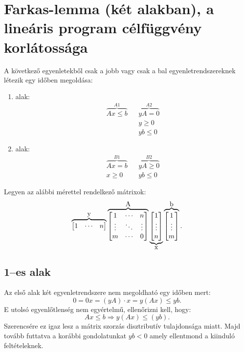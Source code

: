\newpage
\section{Farkas-lemma (két alakban), a lineáris program célfüggvény korlátossága}

A következő egyenletekből csak a jobb vagy csak a bal egyenletrendszereknek
létezik egy időben megoldása:

\begin{enumerate}
  \item alak: \begin{align*}
  \overbrace{Ax \leq b}^{A1}  && \overbrace{yA= 0}^{A2}\\
   			 && y\geq 0 \\
             && yb\leq 0
  \end{align*}
  \item alak:\begin{align*}
  \overbrace{Ax = b }^{B1}   && \overbrace{yA \geq 0}^{B2}\\
  x \geq 0 && yb \leq 0 
  \end{align*}
\end{enumerate}

Legyen az alábbi mérettel rendelkező mátrixok:
\[
\overbrace{\begin{bmatrix} 1 &  \cdots &  n \end{bmatrix}}^{\hbox{y}} 
\overbrace{\begin{bmatrix} 1 & \cdots & n \\ \vdots & \ddots & \vdots \\ m  & \cdots & 0 \end{bmatrix}}^{\hbox{A}}
\underbrace{\begin{bmatrix} 1 \\ \vdots \\  n \end{bmatrix}}_{\hbox{x}}
\overbrace{\begin{bmatrix} 1 \\ \vdots \\  m \end{bmatrix}}^{\hbox{b}}.
\]

\subsection{1--es alak}
Az első alak két egyenletrendszere nem megoldható egy időben mert:
\[ 0 = 0x = (yA) \cdot x = y(Ax) \leq yb.\] E utolsó egyenlőtlenség nem
egyértelmű, ellenőrizni kell, hogy:
\[ Ax \leq b \Rightarrow y(Ax) \leq (yb).\] Szerencsére ez igaz lesz a mátrix
szorzás disztributív tulajdonsága miatt. Majd tovább futtatva a korábbi
gondolatunkat $yb<0$ amely ellentmond a kiinduló feltételeknek.

